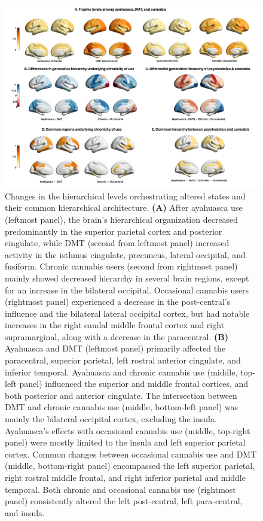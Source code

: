 \begin{figure}[h!]
    \centering
    \includegraphics[width=\textwidth]{images/Figure 3_ HL.png}
    \caption[Changes in hierarchical levels orchestrating altered states and their common architecture]{Changes in
the hierarchical levels orchestrating altered states and their common
hierarchical architecture. \textbf{(A)} After ayahuasca use (leftmost
panel), the brain's hierarchical organization decreased predominantly in
the superior parietal cortex and posterior cingulate, while DMT (second
from leftmost panel) increased activity in the isthmus cingulate,
precuneus, lateral occipital, and fusiform. Chronic cannabis users
(second from rightmost panel) mainly showed decreased hierarchy in
several brain regions, except for an increase in the bilateral
occipital. Occasional cannabis users (rightmost panel) experienced a
decrease in the post-central's influence and the bilateral lateral
occipital cortex, but had notable increases in the right caudal middle
frontal cortex and right supramarginal, along with a decrease in the
paracentral. \textbf{(B)} Ayahuasca and DMT (leftmost panel) primarily
affected the paracentral, superior parietal, left rostral anterior
cingulate, and inferior temporal. Ayahuasca and chronic cannabis use
(middle, top-left panel) influenced the superior and middle frontal
cortices, and both posterior and anterior cingulate. The intersection
between DMT and chronic cannabis use (middle, bottom-left panel) was
mainly the bilateral occipital cortex, excluding the insula. Ayahuasca's
effects with occasional cannabis use (middle, top-right panel) were
mostly limited to the insula and left superior parietal cortex. Common
changes between occasional cannabis use and DMT (middle, bottom-right
panel) encompassed the left superior parietal, right rostral middle
frontal, and right inferior parietal and middle temporal. Both chronic
and occasional cannabis use (rightmost panel) consistently altered the
left post-central, left para-central, and insula.}
    \label{fig:tcrender}
\end{figure}

